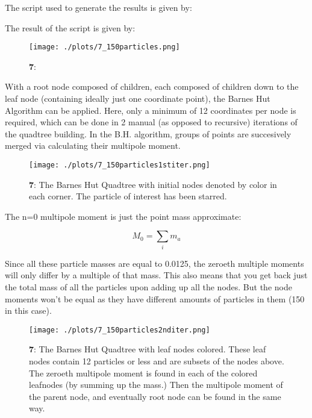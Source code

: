 The script used to generate the results is given by:
  


The result of the script is given by:




\begin{figure}[h!]
  \centering
  \texttt{[image: ./plots/7\_150particles.png]}
  \caption{\textbf{7}:}
\end{figure}

With a root node composed of children, each composed of children down to the leaf node (containing ideally just one coordinate point), the Barnes Hut Algorithm can be applied. Here, only a minimum of 12 coordinates per node is required, which can be done in 2 manual (as opposed to recursive) iterations of the quadtree building.
In the B.H. algorithm, groups of points are succesively merged via calculating their multipole moment.

\begin{figure}[h!]
  \centering
  \texttt{[image: ./plots/7\_150particles1stiter.png]}
  \caption{\textbf{7}: The Barnes Hut Quadtree with initial nodes denoted by color in each corner. The particle of interest has been starred.}
  \label{fig:spatialdensitygrowtht0}
\end{figure}


The n=0 multipole moment is just the point mass approximate:

\begin{equation}
  M_0=\sum_i m_a
\end{equation}

Since all these particle masses are equal to 0.0125, the zeroeth multiple moments will only differ by a multiple of that mass. This also means that you get back just the total mass of all the particles upon adding up all the nodes. But the node moments won't be equal as they have different amounts of particles in them (150 in this case).


\begin{figure}[h!]
  \centering
  \texttt{[image: ./plots/7\_150particles2nditer.png]}
  \caption{\textbf{7}: The Barnes Hut Quadtree with leaf nodes colored. These leaf nodes contain 12 particles or less and are subsets of the nodes above. The zeroeth multipole moment is found in each of the colored leafnodes (by summing up the mass.) Then the multipole moment of the parent node, and eventually root node can be found in the same way.}
\end{figure}